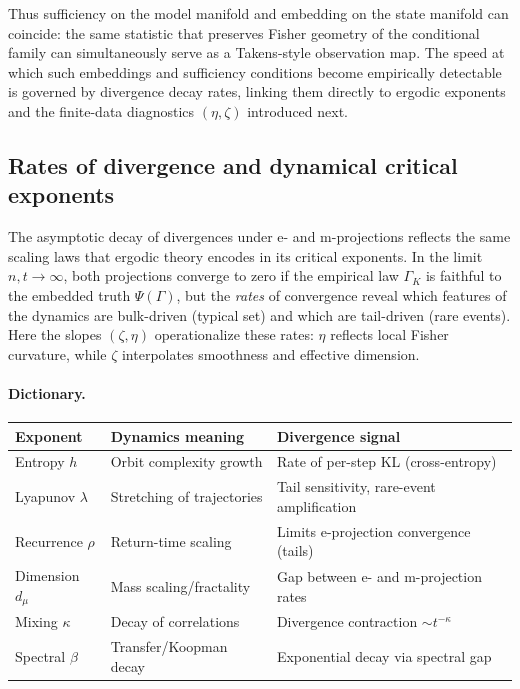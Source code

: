 \documentclass[11pt]{article}
\newcommand{\1}{\mathbf{1}}
\begin{document}
\medskip

Thus sufficiency on the model manifold and embedding on the state manifold 
can coincide: the same statistic that preserves Fisher geometry of the 
conditional family can simultaneously serve as a Takens-style observation map. 
The speed at which such embeddings and sufficiency conditions become empirically 
detectable is governed by divergence decay rates, linking them directly to 
ergodic exponents and the finite-data diagnostics $(\eta,\zeta)$ introduced next.


\subsection{Rates of divergence and dynamical critical exponents}

The asymptotic decay of divergences under e- and m-projections reflects the same scaling laws that ergodic theory encodes in its critical exponents. In the limit $n,t\to\infty$, both projections converge to zero if the empirical law $\Gamma_K$ is faithful to the embedded truth $\Psi(\Gamma)$, but the \emph{rates} of convergence reveal which features of the dynamics are bulk-driven (typical set) and which are tail-driven (rare events). Here the slopes $(\zeta,\eta)$ operationalize these rates: $\eta$ reflects local Fisher curvature, while $\zeta$ interpolates smoothness and effective dimension.

\paragraph{Dictionary.}
\begin{center}
\begin{tabular}{|l|l|l|}
\hline
\textbf{Exponent} & \textbf{Dynamics meaning} & \textbf{Divergence signal} \\
\hline
Entropy $h$ & Orbit complexity growth & Rate of per-step KL (cross-entropy) \\
Lyapunov $\lambda$ & Stretching of trajectories & Tail sensitivity, rare-event amplification \\
Recurrence $\rho$ & Return-time scaling & Limits e-projection convergence (tails) \\
Dimension $d_\mu$ & Mass scaling/fractality & Gap between e- and m-projection rates \\
Mixing $\kappa$ & Decay of correlations & Divergence contraction $\sim t^{-\kappa}$ \\
Spectral $\beta$ & Transfer/Koopman decay & Exponential decay via spectral gap \\
\hline
\end{tabular}
\end{center}
\end{document}
